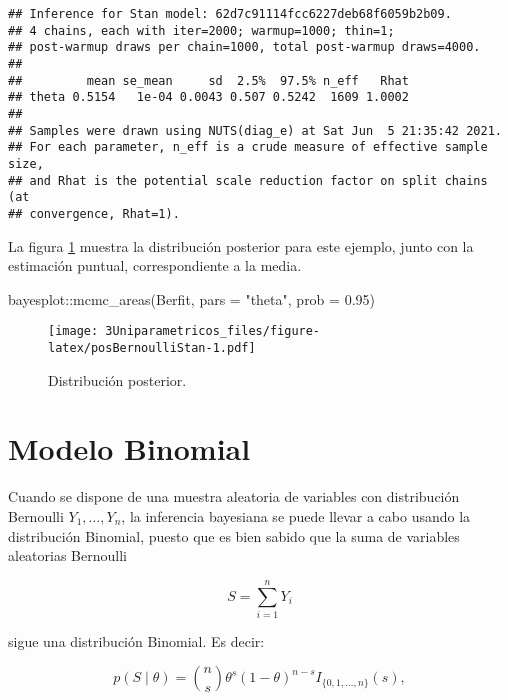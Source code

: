 \documentclass[
  12pt,
  spanish,
]{book}
\newenvironment{Shaded}{\begin{snugshade}}{\end{snugshade}}
\newcommand{\AttributeTok}[1]{\textcolor[rgb]{0.77,0.63,0.00}{#1}}
\newcommand{\FloatTok}[1]{\textcolor[rgb]{0.00,0.00,0.81}{#1}}
\newcommand{\FunctionTok}[1]{\textcolor[rgb]{0.00,0.00,0.00}{#1}}
\newcommand{\NormalTok}[1]{#1}
\newcommand{\SpecialCharTok}[1]{\textcolor[rgb]{0.00,0.00,0.00}{#1}}
\newcommand{\StringTok}[1]{\textcolor[rgb]{0.31,0.60,0.02}{#1}}
\theoremstyle{definition}
\theoremstyle{definition}
\theoremstyle{definition}
\theoremstyle{definition}
\theoremstyle{remark}
\begin{document}
\begin{verbatim}
## Inference for Stan model: 62d7c91114fcc6227deb68f6059b2b09.
## 4 chains, each with iter=2000; warmup=1000; thin=1; 
## post-warmup draws per chain=1000, total post-warmup draws=4000.
## 
##         mean se_mean     sd  2.5%  97.5% n_eff   Rhat
## theta 0.5154   1e-04 0.0043 0.507 0.5242  1609 1.0002
## 
## Samples were drawn using NUTS(diag_e) at Sat Jun  5 21:35:42 2021.
## For each parameter, n_eff is a crude measure of effective sample size,
## and Rhat is the potential scale reduction factor on split chains (at 
## convergence, Rhat=1).
\end{verbatim}

La figura \ref{fig:posBernoulliStan} muestra la distribución posterior para este ejemplo, junto con la estimación puntual, correspondiente a la media.

\begin{Shaded}
\begin{Highlighting}[]
\NormalTok{bayesplot}\SpecialCharTok{::}\FunctionTok{mcmc\_areas}\NormalTok{(Berfit, }\AttributeTok{pars =} \StringTok{"theta"}\NormalTok{, }
                      \AttributeTok{prob =} \FloatTok{0.95}\NormalTok{)}
\end{Highlighting}
\end{Shaded}

\begin{figure}
\centering
\texttt{[image: 3Uniparametricos\_files/figure-latex/posBernoulliStan-1.pdf]}
\caption{\label{fig:posBernoulliStan}Distribución posterior.}
\end{figure}

\hypertarget{modelo-binomial}{%
\section{Modelo Binomial}\label{modelo-binomial}}

Cuando se dispone de una muestra aleatoria de variables con distribución
Bernoulli \(Y_1,\ldots,Y_n\), la inferencia bayesiana se puede llevar a
cabo usando la distribución Binomial, puesto que es bien sabido que la
suma de variables aleatorias Bernoulli

\begin{equation*}
S=\sum_{i=1}^nY_i
\end{equation*}

sigue una distribución Binomial. Es decir:

\begin{equation}
p(S \mid \theta)=\binom{n}{s}\theta^s(1-\theta)^{n-s}I_{\{0,1,\ldots,n\}}(s),
\end{equation}
\end{document}
